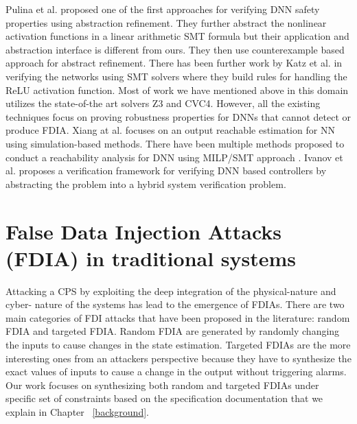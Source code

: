 Pulina et al.\cite{10.1007/978-3-642-14295-6_24} proposed one of the first approaches for verifying DNN safety properties using abstraction refinement. They further abstract \cite{article} the nonlinear activation functions in a linear arithmetic SMT formula but their application and abstraction interface is different from ours. They then use counterexample based approach for abstract refinement. There has been further work by Katz et al.\cite{10.1007/978-3-319-63387-9_5} in verifying the networks using SMT solvers where they build rules for handling the ReLU activation function. Most of work we have mentioned above in this domain utilizes the state-of-the art solvers Z3 and CVC4. However, all the existing techniques focus on proving robustness properties \cite{NIPS2016_6339} for DNNs that cannot detect or produce FDIA. Xiang at al.\cite{xiang2017output} focuses on an output reachable estimation for NN using simulation-based methods. There have been multiple methods proposed to conduct a reachability analysis for DNN using MILP/SMT approach \cite{10.1145/3302504.3313351} \cite{ehlers2017formal} \cite{10.1007/978-3-319-63387-9_5} \cite{lomuscio2017approach} \cite{article}. Ivanov et al. \cite{ivanov2018verisig} proposes a verification framework for verifying DNN based controllers by abstracting the problem into a hybrid system verification problem.  


\section{False Data Injection Attacks (FDIA) in traditional systems}
Attacking a CPS by exploiting the deep integration of the physical-nature and cyber- nature of the systems has lead to the emergence of FDIAs. 
There are two main categories of FDI attacks that have been proposed in the literature: random FDIA and targeted FDIA. Random FDIA are generated by randomly changing the inputs to cause changes in the state estimation. Targeted FDIAs are the more interesting ones from an attackers perspective because they have to synthesize the exact values of inputs to cause a change in the output without triggering alarms. Our work focuses on synthesizing both random and targeted FDIAs under specific set of constraints based on the specification documentation that we explain in Chapter ~\ref{background}. 

